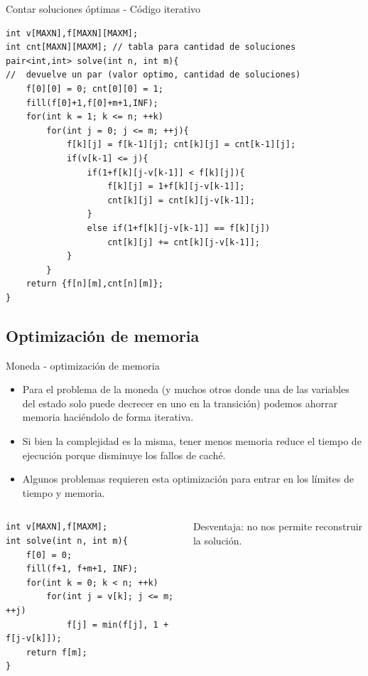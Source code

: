 \documentclass{beamer}
\begin{document}
\begin{frame}[fragile]{Contar soluciones \'optimas - C\'odigo iterativo}
\begin{lstlisting}
int v[MAXN],f[MAXN][MAXM];
int cnt[MAXN][MAXM]; // tabla para cantidad de soluciones
pair<int,int> solve(int n, int m){
//	devuelve un par (valor optimo, cantidad de soluciones)
	f[0][0] = 0; cnt[0][0] = 1;
	fill(f[0]+1,f[0]+m+1,INF);
	for(int k = 1; k <= n; ++k)
		for(int j = 0; j <= m; ++j){
			f[k][j] = f[k-1][j]; cnt[k][j] = cnt[k-1][j];
			if(v[k-1] <= j){
				if(1+f[k][j-v[k-1]] < f[k][j]){
					f[k][j] = 1+f[k][j-v[k-1]];
					cnt[k][j] = cnt[k][j-v[k-1]];
				}
				else if(1+f[k][j-v[k-1]] == f[k][j])
					cnt[k][j] += cnt[k][j-v[k-1]];
			}
		}
	return {f[n][m],cnt[n][m]};
}

\end{lstlisting}
\end{frame}

\subsection{Optimizaci\'on de memoria}

\begin{frame}[fragile]{Moneda - optimizaci\'on de memoria}
\begin{itemize}
\item
Para el problema de la moneda (y muchos otros donde una de las variables del estado solo puede decrecer en uno en la transici\'on) podemos ahorrar memoria haci\'endolo de forma iterativa.
\item
Si bien la complejidad es la misma, tener menos memoria reduce el tiempo de ejecuci\'on porque disminuye los fallos de cach\'e.
\item
Algunos problemas requieren esta optimizaci\'on para entrar en los l\'imites de tiempo y memoria.
\end{itemize}
\begin{columns}
\begin{column}{0.65\textwidth}
\begin{lstlisting}
int v[MAXN],f[MAXM];
int solve(int n, int m){
	f[0] = 0;
	fill(f+1, f+m+1, INF);
	for(int k = 0; k < n; ++k)
		for(int j = v[k]; j <= m; ++j)
			f[j] = min(f[j], 1 + f[j-v[k]]);
	return f[m];
}
\end{lstlisting}
\end{column}
\begin{column}{0.35\textwidth}
Desventaja: no nos permite reconstruir la soluci\'on.
\end{column}
\end{columns}
\end{frame}
\end{document}
